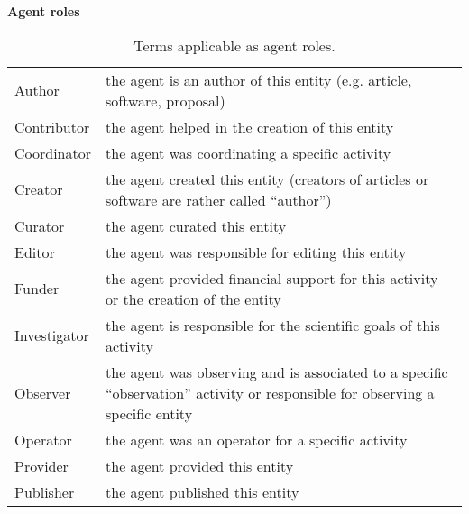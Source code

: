 
\begin{table}[ht]
\small
{}\textwidth
\textbf{\normalsize Agent roles}\vspace{0.25em}\\
\begin{tabulary}{1.0\textwidth}{lp{8cm}}
\toprule
{} &  \\
\midrule
Author      & the agent is an author of this entity (e.g. article, software, proposal)\\
Contributor & the agent helped in the creation of this entity \\
Coordinator & the agent was coordinating a specific activity \\ %
Creator     & the agent created this entity (creators of articles or software are rather called ``author'') \\
Curator     & the agent curated this entity \\
Editor      & the agent was responsible for editing this entity \\
Funder      & the agent provided financial support for this activity or the creation of the entity \\
Investigator & the agent is responsible for the scientific goals of this activity \\
Observer    & the agent was observing and is associated to a specific “observation” activity or responsible for observing a specific entity \\
Operator    & the agent was an operator for a specific activity \\ %
Provider    & the agent provided this entity \\
Publisher   & the agent published this entity \\
\bottomrule
\end{tabulary}
\caption[Terms applicable as agent roles.]{Terms applicable as agent roles.}
\label{tab:agent-roles}
\end{table}




